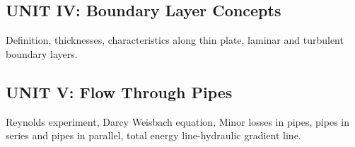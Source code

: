 \documentclass[12pt, a4paper]{article}
\begin{document}
                                                                                                                                                                                                                                                                                                                                                                                                            \subsection*{UNIT IV: Boundary Layer Concepts}
                                                                                                                                                                                                                                                                                                                                                                                                            \noindent Definition, thicknesses, characteristics along thin plate, laminar and turbulent boundary layers.

                                                                                                                                                                                                                                                                                                                                                                                                            \subsection*{UNIT V: Flow Through Pipes}
                                                                                                                                                                                                                                                                                                                                                                                                            \noindent Reynolds experiment, Darcy Weisbach equation, Minor losses in pipes, pipes in series and pipes in parallel, total energy line-hydraulic gradient line.
\end{document}

